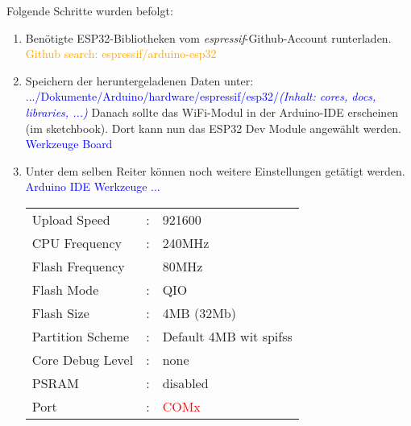 Folgende Schritte wurden befolgt:
\begin{enumerate}
\item Benötigte ESP32-Bibliotheken vom \textit{espressif}-Github-Account runterladen.\cite{grokhotkov_espressifarduino-esp32_2020} \newline
\textcolor{orange}{Github search: espressif/arduino-esp32} \cite{grokhotkov_espressifarduino-esp32_2020}
\newline

\item Speichern der heruntergeladenen Daten unter:\newline
\textcolor{blue}{.../Dokumente/Arduino/hardware/espressif/esp32/\textit{(Inhalt: cores, docs, libraries, ...)}}\newline
Danach sollte das WiFi-Modul in der Arduino-IDE erscheinen (im sketchbook). Dort kann nun das ESP32 Dev Module angewählt werden.\newline
\textcolor{blue} {Werkzeuge \textrightarrow Board}\newline
\item Unter dem selben Reiter können noch weitere Einstellungen getätigt werden.\newline
\textcolor{blue}{Arduino IDE \textrightarrow Werkzeuge \textrightarrow ...}\newline
\begin{tabular}{lll}
Upload Speed & : & 921600\\
CPU Frequency & : & 240MHz\\
Flash Frequency & & 80MHz\\
Flash Mode & : & QIO\\
Flash Size & : & 4MB (32Mb)\\
Partition Scheme & : & Default 4MB wit spifss\\
Core Debug Level & : & none\\
PSRAM & : & disabled\\
Port & : & \textcolor{red}{COMx}\\
\end{tabular}


\end{enumerate}
